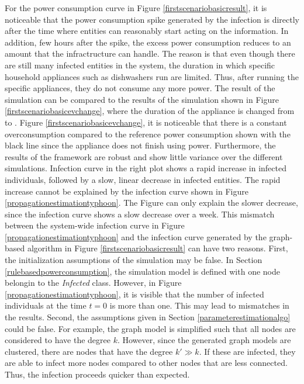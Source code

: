 For the power consumption curve in Figure \ref{firstscenariobasicresult}, 
it is noticeable
that the power consumption spike generated by the infection is directly
after the time where entities can reasonably start acting on the information.
In addition, few hours after the spike, the excess power consumption
reduces to an amount that the infractructure can handle. 
The reason is that even though there are still many infected entities
in the system, the duration in which specific household appliances
such as dishwashers run are limited. Thus, after running the specific
appliances, they do not consume any more power. The result of the simulation
can be compared to the results of the simulation shown in 
Figure \ref{firstscenariobasicevchange}, where the duration of the 
appliance  is changed from  to .
Figure \ref{firstscenariobasicevchange}, it is noticeable 
that there is a constant overconsumption compared to the reference
power consumption shown with the black line since the 
appliance does not finish using power.
Furthermore, the 
results of the framework are robust and show little variance over the
different simulations. 
Infection curve in the right plot shows a rapid increase in infected 
individuals, followed by a slow, linear decrease in infected entities.
The rapid increase cannot be explained by the 
infection curve shown in Figure \ref{propagationestimationtyphoon}.
The Figure can only explain the slower decrease, since the infection
curve shows a slow decrease over a week. This mismatch between
the system-wide infection curve in Figure \ref{propagationestimationtyphoon}
and the infection curve generated by the graph-based algorithm 
in Figure \ref{firstscenariobasicresult} can have two reasons. 
First, the initialization assumptions of the simulation may be false.
In Section \ref{rulebasedpowerconsumption}, the simulation model
is defined with one node belongin to the \textit{Infected} class.
However, in Figure \ref{propagationestimationtyphoon}, it
is visible that the number of infected individuals at the 
time $t=0$ is more than one. This may lead to mismatches 
in the results. Second, the assumptions given in Section 
\ref{parameterestimationalgo} could be false. For example, 
the graph model is simplified such that all nodes are considered
to have the degree $k$. However, since the generated graph models 
are clustered, there are nodes that have the degree $k'\gg k$. 
If these are infected, they are able to infect more nodes compared
to other nodes that are less connected. Thus, the infection 
proceeds quicker than expected.

